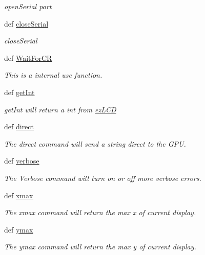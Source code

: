 \begin{DoxyCompactItemize}
\begin{DoxyCompactList}\small\item\em open\-Serial port \end{DoxyCompactList}\item 
def \hyperlink{namespacemodule_1_1ez_l_c_d3xx_afdb7ffc93beb3ec80add86bad92dadac}{close\-Serial}
\begin{DoxyCompactList}\small\item\em close\-Serial \end{DoxyCompactList}\item 
def \hyperlink{namespacemodule_1_1ez_l_c_d3xx_a9c709d105cdc1e75f3b59214ba0f65d8}{Wait\-For\-C\-R}
\begin{DoxyCompactList}\small\item\em This is a internal use function. \end{DoxyCompactList}\item 
def \hyperlink{namespacemodule_1_1ez_l_c_d3xx_a9d726a61d1d0a3bb648bd9c4becb3788}{get\-Int}
\begin{DoxyCompactList}\small\item\em get\-Int will return a int from \hyperlink{classmodule_1_1ez_l_c_d3xx_1_1ez_l_c_d}{ez\-L\-C\-D} \end{DoxyCompactList}\item 
def \hyperlink{group___general_gaae4c9fde1cb31e9eeb914f81698c6c92}{direct}
\begin{DoxyCompactList}\small\item\em The direct command will send a string direct to the G\-P\-U. \end{DoxyCompactList}\item 
def \hyperlink{group___general_ga350c2e1be0d3d074d79d7a7278c44a22}{verbose}
\begin{DoxyCompactList}\small\item\em The Verbose command will turn on or off more verbose errors. \end{DoxyCompactList}\item 
def \hyperlink{group___general_ga594f839f4d44b15ece850c795ec8e7ba}{xmax}
\begin{DoxyCompactList}\small\item\em The xmax command will return the max x of current display. \end{DoxyCompactList}\item 
def \hyperlink{group___general_gae8e395513eeb5519612f3e988a059106}{ymax}
\begin{DoxyCompactList}\small\item\em The ymax command will return the max y of current display. \end{DoxyCompactList}\item 

\end{DoxyCompactItemize}
